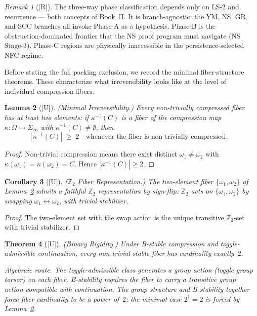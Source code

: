 \documentclass[12pt,oneside]{amsbook}
\theoremstyle{plain}
\newtheorem{theorem}{Theorem}[section]
\newtheorem{lemma}[theorem]{Lemma}
\newtheorem{corollary}[theorem]{Corollary}
\theoremstyle{definition}
\theoremstyle{remark}
\newtheorem{remark}[theorem]{Remark}
\newcommand{\status}[1]{\textup{[#1]}}
\begin{document}
\begin{remark}[\status{R}]
The three-way phase classification depends only on LS-2 and
recurrence — both concepts of Book~II.  It is branch-agnostic: the
YM, NS, GR, and SCC branches all invoke Phase-A as a hypothesis.
Phase-B is the obstruction-dominated frontier that the NS proof
program must navigate (NS Stage-3).  Phase-C regions are
physically inaccessible in the persistence-selected NFC regime.
\end{remark}


Before stating the full packing exclusion, we record the minimal
fiber-structure theorems.  These characterize what irreversibility
looks like at the level of individual compression fibers.

\begin{lemma}[\status{U}]\label{lem:minimal-irreversibility}
\textup{(Minimal Irreversibility.)}  Every non-trivially compressed
fiber has at least two elements: if $\kappa^{-1}(C)$ is a fiber of the
compression map $\kappa : \Omega \to \Sigma_\infty$ with
$\kappa^{-1}(C) \neq \emptyset$, then
\[
  |\kappa^{-1}(C)| \;\geq\; 2
  \quad \text{whenever the fiber is non-trivially compressed.}
\]
\end{lemma}

\begin{proof}
Non-trivial compression means there exist distinct $\omega_1 \neq
\omega_2$ with $\kappa(\omega_1) = \kappa(\omega_2) = C$.  Hence
$|\kappa^{-1}(C)| \geq 2$.
\end{proof}

\begin{corollary}[\status{U}]\label{cor:z2-rep}
\textup{($\mathbb{Z}_2$ Fiber Representation.)}  The two-element fiber
$\{\omega_1, \omega_2\}$ of Lemma~\ref{lem:minimal-irreversibility}
admits a faithful $\mathbb{Z}_2$ representation by sign-flip:
$\mathbb{Z}_2$ acts on $\{\omega_1, \omega_2\}$ by swapping
$\omega_1 \leftrightarrow \omega_2$, with trivial stabilizer.
\end{corollary}

\begin{proof}
The two-element set with the swap action is the unique transitive
$\mathbb{Z}_2$-set with trivial stabilizer.
\end{proof}

\begin{theorem}[\status{U}]\label{thm:binary-rigidity}
\textup{(Binary Rigidity.)}  Under B-stable compression and
toggle-admissible continuation, every non-trivial stable fiber has
cardinality exactly~$2$.

\emph{Algebraic route.}  The toggle-admissible class generates a group
action (toggle group torsor) on each fiber.  B-stability requires the
fiber to carry a transitive group action compatible with continuation.
The group structure and B-stability together force fiber cardinality
to be a power of~$2$; the minimal case $2^1 = 2$ is forced by
Lemma~\ref{lem:minimal-irreversibility}.
\end{theorem}
\end{document}
